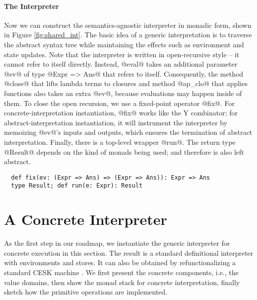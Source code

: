 \paragraph{The Interpreter} Now we can construct the semantics-agnostic interpreter
in monadic form, shown in Figure \ref{fig:shared_int}. The basic idea
of a generic interpretation is to traverse the abstract syntax tree
while maintaining the effects such as environment and state updates.  
Note that the interpreter is written in open-recursive style -- it cannot
refer to itself directly. Instead, @eval@ takes an additional parameter @ev@ of
type @Expr => Ans@ that refers to itself. Consequently, the method @close@ that
lifts lambda terms to closures and method @ap_clo@ that applies functions also
takes an extra @ev@, because evaluations may happen inside of them.
To close the open recursion, we use a fixed-point operator @fix@.
For concrete-interpretation instantiation, @fix@ works like the Y combinator;
for abstract-interpretation instantiation, it will instrument the interpreter
by memoizing @ev@'s inputs and outputs, which ensures the termination of
abstract interpretation.
Finally, there is a top-level wrapper @run@. The return type @Result@
depends on the kind of monads being used; and therefore is also left abstract.
\begin{lstlisting}
  def fix(ev: (Expr => Ans) => (Expr => Ans)): Expr => Ans
  type Result; def run(e: Expr): Result
\end{lstlisting}


\section{A Concrete Interpreter} \label{unstaged_conc}

As the first step in our roadmap, we instantiate the generic interpreter for
concrete execution in this section. The result is a standard definitional
interpreter with environments and stores. It can also be obtained by
refunctionalizing a standard CESK machine \cite{Felleisen:1987:CAH:41625.41654,
DBLP:conf/ppdp/AgerBDM03}. We first present the concrete components, i.e., the
value domains, then show the monad stack for concrete interpretation, finally
sketch how the primitive operations are implemented.

